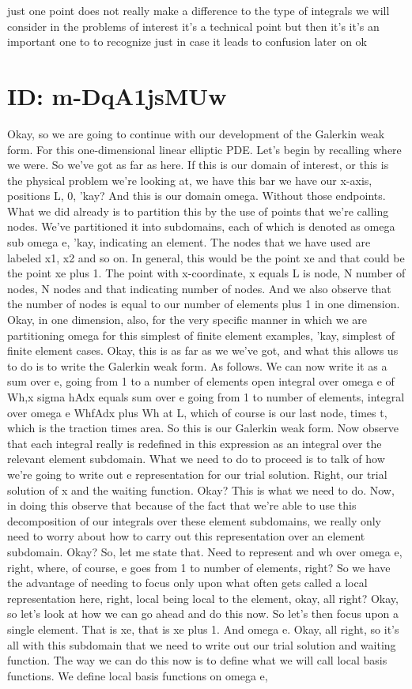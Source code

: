 \documentclass[10pt]{article}
\begin{document}
just one point does not really make a difference to the type of integrals we will consider in the problems of interest it's a technical point but then it's it's an important one to to recognize just in case it leads to confusion later on ok

\section*{ID: m-DqA1jsMUw}
Okay, so we are going to continue with our development of the Galerkin weak form.  For this  one-dimensional linear elliptic PDE. Let's begin by recalling where we were. So we've got as far as here. If this is our domain of interest, or this is the physical problem we're looking at, we have this bar we have our x-axis, positions L, 0, 'kay? And this is our domain omega. Without those endpoints. What we did already is to partition this by the use of points that we're calling nodes. We've partitioned it into subdomains, each of which is denoted as omega sub omega e, 'kay, indicating an element. The nodes that we have used are labeled x1, x2 and so on. In general, this would be the point xe and that could be the point xe plus 1. The point with x-coordinate, x equals L is node, N number of nodes, N nodes and that indicating number of nodes. And we also observe that the number of nodes is equal to our number of elements plus 1 in one dimension. Okay, in one dimension, also, for the very specific manner in which we are partitioning omega for this simplest of finite element examples, 'kay, simplest of finite element cases. Okay, this is as far as we we've got, and what this allows us to do is to write the Galerkin weak form. As follows. We can now write it as a sum over e, going from 1 to a number of elements open integral over omega e of Wh,x sigma hAdx equals sum over e going from 1 to number of elements, integral over omega e WhfAdx plus Wh at L, which of course is our last node, times t, which is the traction times area. So this is our Galerkin weak form. Now observe that each integral really is redefined in this expression as an integral over the relevant element subdomain. What we need to do to proceed is to talk of how we're going to write out e representation for our trial solution. Right, our trial solution of x and the waiting function. Okay? This is what we need to do. Now, in doing this observe that because of the fact that we're able to use this decomposition of our integrals over these element subdomains, we really only need to worry about how to carry out this representation over an element subdomain. Okay? So, let me state that. Need to represent and wh over omega e, right, where, of course, e goes from 1 to number of elements, right? So we have the advantage of needing to focus only upon what often gets called a local representation here, right, local being local to the element, okay, all right? Okay, so let's look at how we can go ahead and do this now. So let's then focus upon a single element. That is xe, that is xe plus 1. And omega e. Okay, all right, so it's all with this subdomain that we need to write out our trial solution and waiting function. The way we can do this now is to define what we will call local basis functions. We define local basis functions on omega e, 
\end{document}
